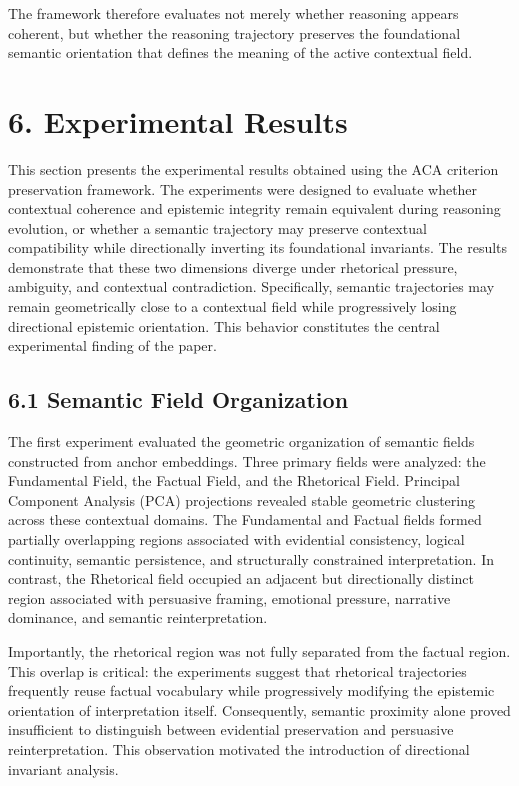 \documentclass[11pt]{article}
\begin{document}
The framework therefore evaluates not merely whether reasoning appears coherent, but whether the reasoning trajectory preserves the foundational semantic orientation that defines the meaning of the active contextual field.

\section{6. Experimental Results}

This section presents the experimental results obtained using the ACA criterion preservation framework. The experiments were designed to evaluate whether contextual coherence and epistemic integrity remain equivalent during reasoning evolution, or whether a semantic trajectory may preserve contextual compatibility while directionally inverting its foundational invariants. The results demonstrate that these two dimensions diverge under rhetorical pressure, ambiguity, and contextual contradiction. Specifically, semantic trajectories may remain geometrically close to a contextual field while progressively losing directional epistemic orientation. This behavior constitutes the central experimental finding of the paper.

\subsection{6.1 Semantic Field Organization}

The first experiment evaluated the geometric organization of semantic fields constructed from anchor embeddings. Three primary fields were analyzed: the Fundamental Field, the Factual Field, and the Rhetorical Field. Principal Component Analysis (PCA) projections revealed stable geometric clustering across these contextual domains. The Fundamental and Factual fields formed partially overlapping regions associated with evidential consistency, logical continuity, semantic persistence, and structurally constrained interpretation. In contrast, the Rhetorical field occupied an adjacent but directionally distinct region associated with persuasive framing, emotional pressure, narrative dominance, and semantic reinterpretation.

Importantly, the rhetorical region was not fully separated from the factual region. This overlap is critical: the experiments suggest that rhetorical trajectories frequently reuse factual vocabulary while progressively modifying the epistemic orientation of interpretation itself. Consequently, semantic proximity alone proved insufficient to distinguish between evidential preservation and persuasive reinterpretation. This observation motivated the introduction of directional invariant analysis.
\end{document}
